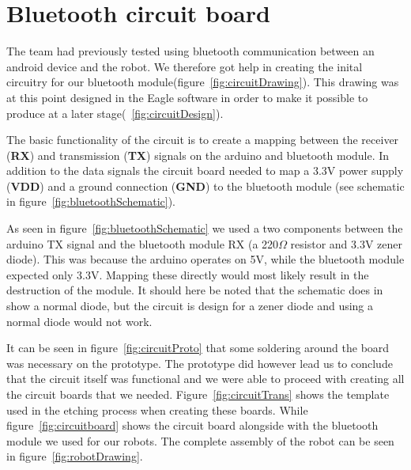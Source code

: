 \section{Bluetooth circuit board}
The \chirp team had previously tested using bluetooth communication between an android device and the robot. We therefore got help in creating the inital circuitry for our bluetooth module(figure~\ref{fig:circuitDrawing}). This drawing was at this point designed in the Eagle software in order to make it possible to produce at a later stage(~\ref{fig:circuitDesign}). 

\bigskip\noindent
The basic functionality of the circuit is to create a mapping between the receiver (\textbf{RX}) and transmission (\textbf{TX}) signals on the arduino and bluetooth module. In addition to the data signals the circuit board needed to map a 3.3V power supply (\textbf{VDD}) and a ground connection (\textbf{GND}) to the bluetooth module (see schematic in figure~\ref{fig:bluetoothSchematic}).


\bigskip\noindent
As seen in figure~\ref{fig:bluetoothSchematic} we used a two components between the arduino TX signal and the bluetooth module RX (a 220$\Omega$ resistor and 3.3V zener diode). This was because the arduino operates on 5V, while the bluetooth module expected only 3.3V. Mapping these directly would most likely result in the destruction of the module. It should here be noted that the schematic does in show a normal diode, but the circuit is design for a zener diode and using a normal diode would not work.

\bigskip\noindent
It can be seen in figure~\ref{fig:circuitProto} that some soldering around the board was necessary on the prototype. The prototype did however lead us to conclude that the circuit itself was functional and we were able to proceed with creating all the circuit boards that we needed. 
Figure~\ref{fig:circuitTrans} shows the template used in the etching process when creating these boards. While figure~\ref{fig:circuitboard} shows the circuit board alongside with the bluetooth module we used for our robots. The complete assembly of the robot can be seen in figure~\ref{fig:robotDrawing}.

